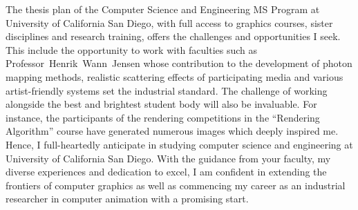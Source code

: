 \documentclass[a4paper, 11pt]{article}
\begin{document}
The thesis plan of the Computer Science and Engineering MS Program at University of California San Diego, with full access to graphics courses, sister disciplines and research training, offers the challenges and opportunities I seek. This include the opportunity to work with faculties such as \mbox{Professor~Henrik~Wann~Jensen} whose contribution to the development of photon mapping methods, realistic scattering effects of participating media and various artist-friendly systems set the industrial standard. The challenge of working alongside the best and brightest student body will also be invaluable. For instance, the participants of the rendering competitions in the ``Rendering Algorithm'' course have generated numerous images which deeply inspired me. Hence, I full-heartedly anticipate in studying computer science and engineering at University of California San Diego. With the guidance from your faculty, my diverse experiences and dedication to excel, I am confident in extending the frontiers of computer graphics as well as commencing my career as an industrial researcher in computer animation with a promising start.

\end{document}

